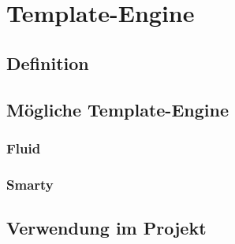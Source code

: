 \chapter{Template-Engine} \label{templateEngine}

\section{Definition} \label{tp:Definition}

\section{Mögliche Template-Engine} \label{tp:Moegliche}

\subsection{Fluid} \label{fluid}

\subsection{Smarty} \label{tp:Smarty}


\section{Verwendung im Projekt} \label{tp:Verwendung}

